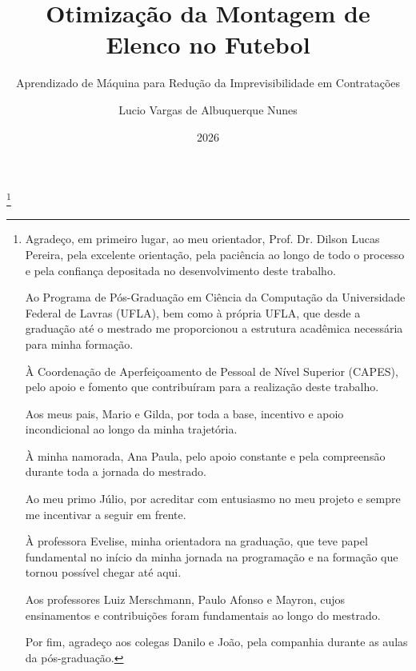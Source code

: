 \documentclass{uflamon}          %
\author{Lucio Vargas de Albuquerque Nunes}
\title{Otimização da Montagem de Elenco no Futebol}
\subtitle{Aprendizado de Máquina para Redução da Imprevisibilidade em Contratações}
\date{2026}
\begin{document}
\maketitle


\thanks{Agradeço, em primeiro lugar, ao meu orientador, Prof. Dr. Dilson Lucas Pereira, pela excelente orientação, pela paciência ao longo de todo o processo e 
pela confiança depositada no desenvolvimento deste trabalho.

Ao Programa de Pós-Graduação em Ciência da Computação da Universidade Federal de Lavras (UFLA), bem como à própria UFLA, que desde a graduação 
até o mestrado me proporcionou a estrutura acadêmica necessária para minha formação.

À Coordenação de Aperfeiçoamento de Pessoal de Nível Superior (CAPES), pelo apoio e fomento que contribuíram para a realização deste trabalho.

Aos meus pais, Mario e Gilda, por toda a base, incentivo e apoio incondicional ao longo da minha trajetória.

À minha namorada, Ana Paula, pelo apoio constante e pela compreensão durante toda a jornada do mestrado.

Ao meu primo Júlio, por acreditar com entusiasmo no meu projeto e sempre me incentivar a seguir em frente.

À professora Evelise, minha orientadora na graduação, que teve papel fundamental no início da minha jornada na programação e na formação que tornou possível chegar até aqui.

Aos professores Luiz Merschmann, Paulo Afonso e Mayron, cujos ensinamentos e contribuições foram fundamentais ao longo do mestrado.

Por fim, agradeço aos colegas Danilo e João, pela companhia durante as aulas da pós-graduação.}         %

\end{document}
